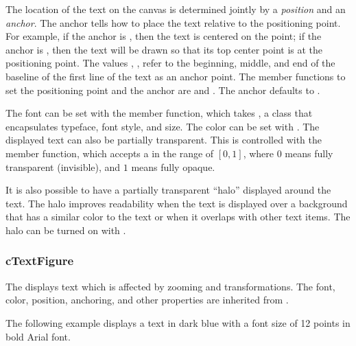 The location of the text on the canvas is determined jointly by a
\textit{position} and an \textit{anchor}. The anchor tells how to
place the text relative to the positioning point. For example,
if the anchor is , then the text is centered on the point;
if the anchor is , then the text will be drawn so that its top
center point is at the positioning point. The values
, ,
 refer to the beginning, middle, and end of the
baseline of the first line of the text as an anchor point. The member
functions to set the positioning point and the anchor are
 and . The anchor defaults to
.

The font can be set with the  member function, which takes
, a class that encapsulates typeface, font style, and
size. The color can be set with . The displayed text can
also be partially transparent. This is controlled with the 
member function, which accepts a  in the range of $[0,1]$, where $0$ means
fully transparent (invisible), and $1$ means fully opaque.

It is also possible to have a partially transparent ``halo'' displayed around
the text. The halo improves readability when the text is displayed over a
background that has a similar color to the text or when it overlaps with other
text items. The halo can be turned on with .


\subsubsection{cTextFigure}
\label{sec:graphics:textfigure}

The  displays text which is affected by zooming and
transformations. The font, color, position, anchoring, and other properties are
inherited from .

The following example displays a text in dark blue with a font size of 12 points
in bold Arial font.


